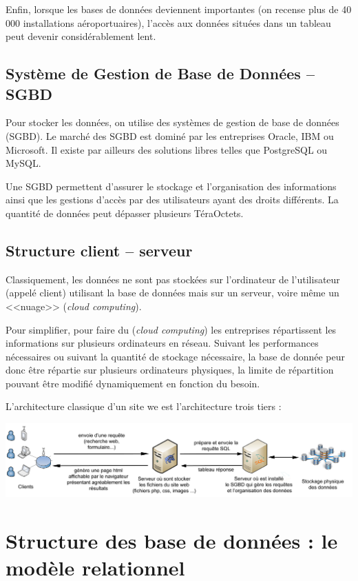 \documentclass[10pt]{article}
\begin{document}
Enfin, lorsque les bases de données deviennent importantes (on recense plus de 40 000 installations aéroportuaires), l'accès aux données situées dans un tableau peut devenir considérablement lent. 

\subsection{Système de Gestion de Base de Données -- SGBD}
Pour stocker les données, on utilise des systèmes de gestion de base de données (SGBD). Le marché des SGBD est dominé par les entreprises Oracle, IBM ou Microsoft. Il existe par ailleurs des solutions libres telles que PostgreSQL ou MySQL. 

Une SGBD permettent d'assurer le stockage et l'organisation des informations ainsi que les gestions d'accès par des utilisateurs ayant des droits différents. La quantité de données peut dépasser plusieurs TéraOctets.


\subsection{Structure client -- serveur}


Classiquement, les données ne sont pas stockées sur l'ordinateur de l'utilisateur (appelé client) utilisant la base de données mais sur un serveur, voire même un <<nuage>> (\textit{cloud computing}). 

Pour simplifier, pour faire du (\textit{cloud computing}) les entreprises répartissent les informations sur plusieurs ordinateurs en réseau. Suivant les performances nécessaires ou suivant la quantité de stockage nécessaire, la base de donnée peur donc être répartie sur plusieurs ordinateurs physiques, la limite de répartition pouvant être modifié dynamiquement en fonction du besoin. 

L'architecture classique d'un site we est l'architecture trois tiers : 
\begin{center}
\includegraphics[width=.9\textwidth]{images/bdd}
\end{center}

\section{Structure des base de données : le modèle relationnel}
\end{document}
